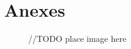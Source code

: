 \section{Anexes}

\begin{figure}[!h]
    \begin{center}
        //TODO place image here
    \end{center}
    \label{cirrus-partners}
    
\end{figure}